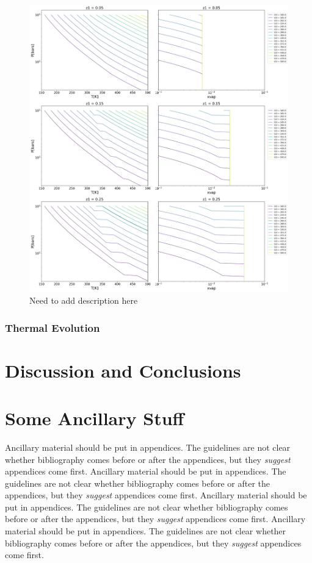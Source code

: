 \documentclass[11pt]{ucscthesisbs}
\begin{document}
\begin{figure}[ht!]
 \centerline{
  \includegraphics[width=7.0in]{figures/static_radiative_layer_plots_without_grid_points.png}
 }
\caption[Inhibition of convection on Neptune]
{Need to add description here }
\label{fig:neptune}
\end{figure}


\subsection{Thermal Evolution}




\chapter{Discussion and Conclusions}





\appendix
\chapter{Some Ancillary Stuff}

Ancillary material should be put in appendices.  The guidelines are not
clear whether bibliography comes before or after the appendices, but they
\emph{suggest} appendices come first.
Ancillary material should be put in appendices.  The guidelines are not
clear whether bibliography comes before or after the appendices, but they
\emph{suggest} appendices come first.
Ancillary material should be put in appendices.  The guidelines are not
clear whether bibliography comes before or after the appendices, but they
\emph{suggest} appendices come first.
Ancillary material should be put in appendices.  The guidelines are not
clear whether bibliography comes before or after the appendices, but they
\emph{suggest} appendices come first.




\end{document}
